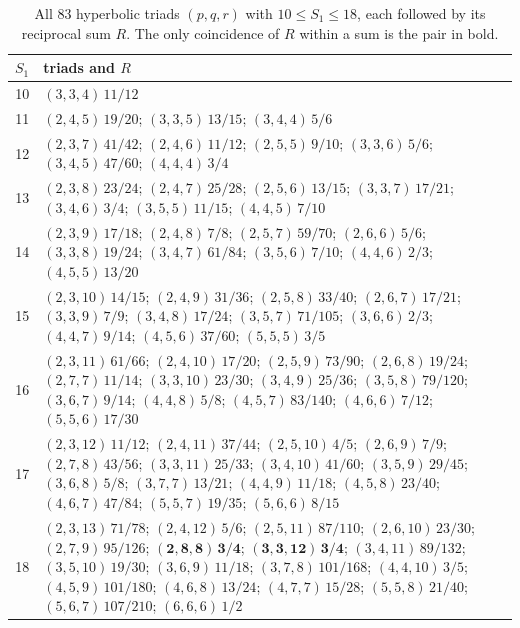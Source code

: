 \begin{table}[ht]
\caption{All $83$ hyperbolic triads $(p,q,r)$ with $10\le S_1\le18$, each followed by its reciprocal sum $R$. The only coincidence of $R$ within a sum is the pair in bold.}\label{tab:enum}
\centering\footnotesize
\begin{tabular}{@{}rp{}@{}}
\toprule
$S_1$ & triads and $R$\\
\midrule
10 & $(3,3,4)\,11/12$ \\
11 & $(2,4,5)\,19/20$; $(3,3,5)\,13/15$; $(3,4,4)\,5/6$ \\
12 & $(2,3,7)\,41/42$; $(2,4,6)\,11/12$; $(2,5,5)\,9/10$; $(3,3,6)\,5/6$; $(3,4,5)\,47/60$; $(4,4,4)\,3/4$ \\
13 & $(2,3,8)\,23/24$; $(2,4,7)\,25/28$; $(2,5,6)\,13/15$; $(3,3,7)\,17/21$; $(3,4,6)\,3/4$; $(3,5,5)\,11/15$; $(4,4,5)\,7/10$ \\
14 & $(2,3,9)\,17/18$; $(2,4,8)\,7/8$; $(2,5,7)\,59/70$; $(2,6,6)\,5/6$; $(3,3,8)\,19/24$; $(3,4,7)\,61/84$; $(3,5,6)\,7/10$; $(4,4,6)\,2/3$; $(4,5,5)\,13/20$ \\
15 & $(2,3,10)\,14/15$; $(2,4,9)\,31/36$; $(2,5,8)\,33/40$; $(2,6,7)\,17/21$; $(3,3,9)\,7/9$; $(3,4,8)\,17/24$; $(3,5,7)\,71/105$; $(3,6,6)\,2/3$; $(4,4,7)\,9/14$; $(4,5,6)\,37/60$; $(5,5,5)\,3/5$ \\
16 & $(2,3,11)\,61/66$; $(2,4,10)\,17/20$; $(2,5,9)\,73/90$; $(2,6,8)\,19/24$; $(2,7,7)\,11/14$; $(3,3,10)\,23/30$; $(3,4,9)\,25/36$; $(3,5,8)\,79/120$; $(3,6,7)\,9/14$; $(4,4,8)\,5/8$; $(4,5,7)\,83/140$; $(4,6,6)\,7/12$; $(5,5,6)\,17/30$ \\
17 & $(2,3,12)\,11/12$; $(2,4,11)\,37/44$; $(2,5,10)\,4/5$; $(2,6,9)\,7/9$; $(2,7,8)\,43/56$; $(3,3,11)\,25/33$; $(3,4,10)\,41/60$; $(3,5,9)\,29/45$; $(3,6,8)\,5/8$; $(3,7,7)\,13/21$; $(4,4,9)\,11/18$; $(4,5,8)\,23/40$; $(4,6,7)\,47/84$; $(5,5,7)\,19/35$; $(5,6,6)\,8/15$ \\
18 & $(2,3,13)\,71/78$; $(2,4,12)\,5/6$; $(2,5,11)\,87/110$; $(2,6,10)\,23/30$; $(2,7,9)\,95/126$; $\mathbf{(2,8,8)\,3/4}$; $\mathbf{(3,3,12)\,3/4}$; $(3,4,11)\,89/132$; $(3,5,10)\,19/30$; $(3,6,9)\,11/18$; $(3,7,8)\,101/168$; $(4,4,10)\,3/5$; $(4,5,9)\,101/180$; $(4,6,8)\,13/24$; $(4,7,7)\,15/28$; $(5,5,8)\,21/40$; $(5,6,7)\,107/210$; $(6,6,6)\,1/2$ \\
\bottomrule
\end{tabular}
\end{table}
